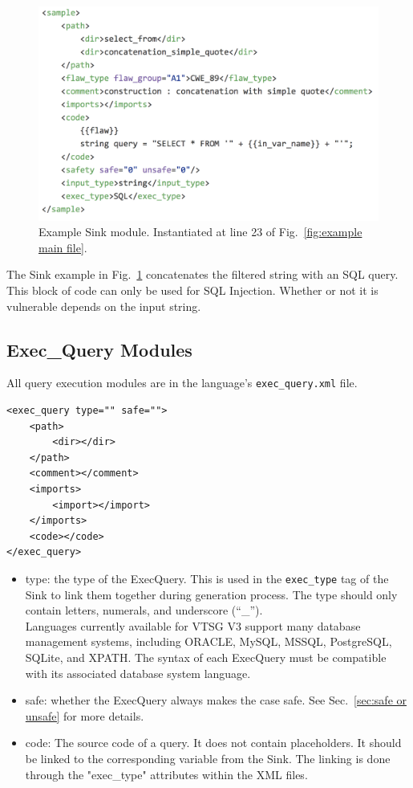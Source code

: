 \documentclass[12pt]{article}
\begin{document}
\begin{figure}[htbp]
  \includegraphics[width=\linewidth]{fig_Sink_file.png}
  \caption{Example Sink module. Instantiated at line 23 of Fig.~\ref{fig:example main file}.}
  \label{fig:example sink file}
\end{figure}

The Sink example in Fig.~\ref{fig:example sink file} 
concatenates the filtered string with an SQL query.  This block
of code can only be used for SQL Injection.  Whether or not it is
vulnerable depends on the input string.


\subsection{Exec\_Query Modules}

All query execution modules are in the language's \verb|exec_query.xml|
file.

\begin{verbatim}
<exec_query type="" safe="">
    <path>
        <dir></dir>
    </path>
    <comment></comment>
    <imports>
        <import></import>
    </imports>
    <code></code>
</exec_query>
\end{verbatim}

\begin{itemize}
    \item type: the type of the ExecQuery. This is used in the
    \verb|exec_type| tag of the Sink to link them together during
    generation process.  The type should only contain letters, numerals, and
    underscore (``\_'').\\
    Languages currently available for VTSG V3 support many database management
    systems, including ORACLE, MySQL, MSSQL, PostgreSQL, SQLite, and XPATH.
    The syntax of each ExecQuery must be
    compatible with its associated database system language.
    
    \item safe: whether the ExecQuery always makes the case safe.
    See Sec.~\ref{sec:safe or unsafe} for more details.

    \item code: The source code of a query. It does not contain placeholders.
    It should be linked to the corresponding variable from the Sink. The linking is done through the "exec\_type" attributes within the XML files.
\end{itemize}
\end{document}
